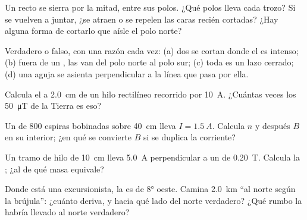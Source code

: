 \begin{exercise}[$\star$]\label{exo:g11:magnetic-fields:1}
Un  recto se sierra por la mitad, entre sus polos. ¿Qué polos lleva
cada trozo? Si se vuelven a juntar, ¿se atraen o se repelen las caras
recién cortadas? ¿Hay alguna forma de cortarlo que aísle el polo norte?
\end{exercise}

\begin{exercise}[$\star$]\label{exo:g11:magnetic-fields:2}
Verdadero o falso, con una razón cada vez: (a) dos  se cortan donde el  es intenso; (b) fuera de un , las
 van del polo norte al polo sur; (c) toda  es un lazo cerrado; (d) una aguja se asienta perpendicular a
la línea que pasa por ella.
\end{exercise}

\begin{exercise}[$\star$]\label{exo:g11:magnetic-fields:3}
Calcula el  a \qty{2.0}{cm} de un hilo rectilíneo recorrido por
\qty{10}{A}. ¿Cuántas veces los \qty{50}{\micro T} de la Tierra es eso?
\end{exercise}

\begin{exercise}[$\star$]\label{exo:g11:magnetic-fields:4}
Un  de $800$ espiras bobinadas sobre \qty{40}{cm} lleva
$I = \qty{1.5}{A}$. Calcula $n$ y después $B$ en su interior; ¿en qué se
convierte $B$ si se duplica la corriente?
\end{exercise}

\begin{exercise}[$\star$]\label{exo:g11:magnetic-fields:5}
Un tramo de hilo de \qty{10}{cm} lleva \qty{5.0}{A} perpendicular a un
 de \qty{0.20}{T}. Calcula la ; ¿al  de qué
masa equivale?
\end{exercise}

\begin{exercise}[$\star\star$]\label{exo:g11:magnetic-fields:6}
Donde está una excursionista, la  es de $\ang{8}$ oeste.
Camina \qty{2.0}{km} ``al norte según la brújula'': ¿cuánto deriva, y
hacia qué lado del norte verdadero? ¿Qué rumbo la habría llevado al
norte verdadero?
\end{exercise}

